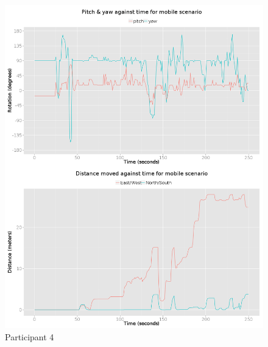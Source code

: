 \begin{figure}[h]
	\begin{center}
		\includegraphics[width=\linewidth]{images/25072014_1500_4up.png}
		\caption{Participant 4}
		\label{participant_4_4up}
	\end{center}
\end{figure}

